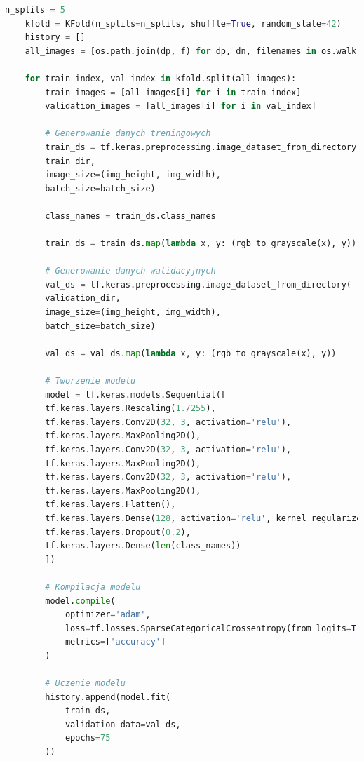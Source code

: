 \begin{lstlisting}[language=Python,caption=Listing skryptu tworzącego model z walidacją krzyżową
	oraz uczonym na wszystkich wariantach liczby wierzchołków grafów,label={tests-model-1}]
	n_splits = 5
	kfold = KFold(n_splits=n_splits, shuffle=True, random_state=42)
	history = []
	all_images = [os.path.join(dp, f) for dp, dn, filenames in os.walk(data_dir_model) for f in filenames if os.path.splitext(f)[1] == '.png']
  
	for train_index, val_index in kfold.split(all_images):
		train_images = [all_images[i] for i in train_index]
		validation_images = [all_images[i] for i in val_index]

		# Generowanie danych treningowych
		train_ds = tf.keras.preprocessing.image_dataset_from_directory(
		train_dir,
		image_size=(img_height, img_width),
		batch_size=batch_size)

		class_names = train_ds.class_names

		train_ds = train_ds.map(lambda x, y: (rgb_to_grayscale(x), y))

		# Generowanie danych walidacyjnych
		val_ds = tf.keras.preprocessing.image_dataset_from_directory(
		validation_dir,
		image_size=(img_height, img_width),
		batch_size=batch_size)

		val_ds = val_ds.map(lambda x, y: (rgb_to_grayscale(x), y))

		# Tworzenie modelu
		model = tf.keras.models.Sequential([
		tf.keras.layers.Rescaling(1./255),
		tf.keras.layers.Conv2D(32, 3, activation='relu'),
		tf.keras.layers.MaxPooling2D(),
		tf.keras.layers.Conv2D(32, 3, activation='relu'),
		tf.keras.layers.MaxPooling2D(),
		tf.keras.layers.Conv2D(32, 3, activation='relu'),
		tf.keras.layers.MaxPooling2D(),
		tf.keras.layers.Flatten(),
		tf.keras.layers.Dense(128, activation='relu', kernel_regularizer=tf.keras.regularizers.l2(0.01)),
		tf.keras.layers.Dropout(0.2),
		tf.keras.layers.Dense(len(class_names))
		])
		
		# Kompilacja modelu
		model.compile(
			optimizer='adam',
			loss=tf.losses.SparseCategoricalCrossentropy(from_logits=True),
			metrics=['accuracy']
		)

		# Uczenie modelu
		history.append(model.fit(
			train_ds,
			validation_data=val_ds,
			epochs=75
		))
\end{lstlisting}


